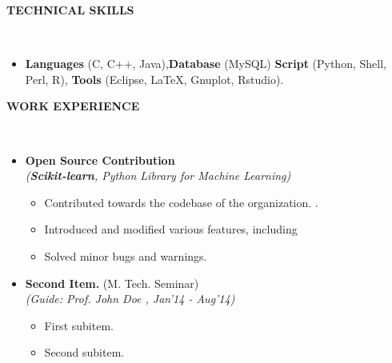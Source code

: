 \documentclass[a4paper,10pt]{article}
\newcommand{\isep}{-2 pt}
\newcommand{\lsep}{-0.5cm}
\newcommand{\resheading}[1]{{\small \colorbox{mygrey}{\begin{minipage}{0.975\textwidth}{\textbf{#1 \vphantom{p\^{E}}}}\end{minipage}}}}
\begin{document}
\resheading{\textbf{TECHNICAL SKILLS} }\\[\lsep]
\begin{itemize}
\item \noindent \textbf{Languages} (C, C++, Java),\textbf{Database} (MySQL) \textbf{Script} (Python, Shell, Perl, R), \textbf{Tools} (Eclipse, \LaTeX, Gnuplot, Rstudio).
\end{itemize}

\resheading{\textbf{WORK EXPERIENCE} }\\[\lsep]
\begin{itemize}
\item \textbf{Open Source Contribution
}  \\
 \emph{(\textbf{Scikit-learn}, Python Library for Machine Learning)} \\[-0.6cm]
	\begin{itemize}\itemsep \isep
	\item Contributed towards the codebase of the organization.
.
	\item Introduced and modified various features, including 

	\item Solved minor bugs and warnings.

	\end{itemize}

\item \textbf{Second Item.
} (M. Tech. Seminar) \\
 \emph{(Guide: Prof. John Doe
, Jan'14 - Aug'14)} \\[-0.6cm]
	\begin{itemize}\itemsep \isep
	\item First subitem.
	\item Second subitem.
	\end{itemize}
\end{itemize}
\end{document}
